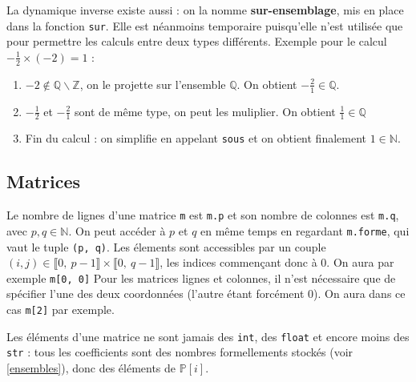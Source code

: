 \documentclass[french]{article}
\newcommand{\p}{\texttt} %
\newcommand{\entiers}[2]{\llbracket #1,\ #2\rrbracket} %
\begin{document}
La dynamique inverse existe aussi : on la nomme \textbf{sur-ensemblage}, mis en place dans la fonction \p{sur}. Elle est néanmoins temporaire puisqu'elle n'est utilisée que pour permettre les calculs entre deux types différents.
Exemple pour le calcul $-\frac{1}{2} \times (-2) = 1$ :
\begin{enumerate}
  \item $-2 \not\in \mathbb{Q} \backslash \mathbb{Z} $, on le projette sur l'ensemble $\mathbb{Q}$. On obtient $-\frac{2}{1} \in \mathbb{Q}$.
  \item $-\frac{1}{2}$ et $-\frac{2}{1}$ sont de même type, on peut les muliplier. On obtient $\frac{1}{1} \in \mathbb{Q}$
  \item Fin du calcul : on simplifie en appelant \p{sous} et on obtient finalement $1 \in \mathbb{N}$.
\end{enumerate}

\subsection{Matrices}

Le nombre de lignes d'une matrice \p{m} est \p{m.p} et son nombre de colonnes est \p{m.q}, avec $p, q \in \mathbb{N}$. On peut accéder à $p$ et $q$ en même temps en regardant \p{m.forme}, qui vaut le tuple \p{(p, q)}. Les élements sont accessibles par un couple $(i, j) \in \entiers{0}{p -1} \times \entiers{0}{q -1}$, les indices commençant donc à 0. On aura par exemple \p{m[0, 0]} Pour les matrices lignes et colonnes, il n'est nécessaire que de spécifier l'une des deux coordonnées (l'autre étant forcément 0). On aura dans ce cas \p{m[2]} par exemple.

Les éléments d'une matrice ne sont jamais des \p{int}, des \p{float} et encore moins des \p{str} : tous les coefficients sont des nombres formellements stockés (voir \ref{ensembles}), donc des éléments de $\mathbb{P}[i]$.
\end{document}
